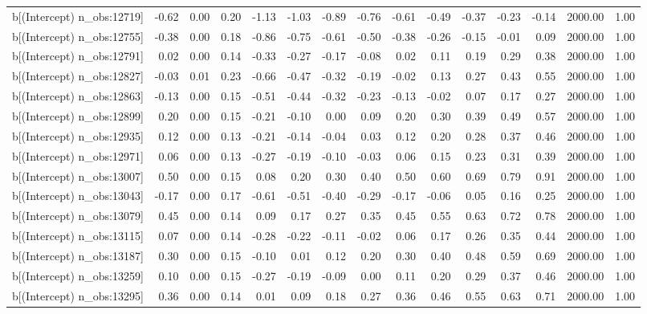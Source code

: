 \begin{table}[ht]
\begin{tabular}{rrrrrrrrrrrrrrr}
  b[(Intercept) n\_obs:12719] & -0.62 & 0.00 & 0.20 & -1.13 & -1.03 & -0.89 & -0.76 & -0.61 & -0.49 & -0.37 & -0.23 & -0.14 & 2000.00 & 1.00 \\ 
  b[(Intercept) n\_obs:12755] & -0.38 & 0.00 & 0.18 & -0.86 & -0.75 & -0.61 & -0.50 & -0.38 & -0.26 & -0.15 & -0.01 & 0.09 & 2000.00 & 1.00 \\ 
  b[(Intercept) n\_obs:12791] & 0.02 & 0.00 & 0.14 & -0.33 & -0.27 & -0.17 & -0.08 & 0.02 & 0.11 & 0.19 & 0.29 & 0.38 & 2000.00 & 1.00 \\ 
  b[(Intercept) n\_obs:12827] & -0.03 & 0.01 & 0.23 & -0.66 & -0.47 & -0.32 & -0.19 & -0.02 & 0.13 & 0.27 & 0.43 & 0.55 & 2000.00 & 1.00 \\ 
  b[(Intercept) n\_obs:12863] & -0.13 & 0.00 & 0.15 & -0.51 & -0.44 & -0.32 & -0.23 & -0.13 & -0.02 & 0.07 & 0.17 & 0.27 & 2000.00 & 1.00 \\ 
  b[(Intercept) n\_obs:12899] & 0.20 & 0.00 & 0.15 & -0.21 & -0.10 & 0.00 & 0.09 & 0.20 & 0.30 & 0.39 & 0.49 & 0.57 & 2000.00 & 1.00 \\ 
  b[(Intercept) n\_obs:12935] & 0.12 & 0.00 & 0.13 & -0.21 & -0.14 & -0.04 & 0.03 & 0.12 & 0.20 & 0.28 & 0.37 & 0.46 & 2000.00 & 1.00 \\ 
  b[(Intercept) n\_obs:12971] & 0.06 & 0.00 & 0.13 & -0.27 & -0.19 & -0.10 & -0.03 & 0.06 & 0.15 & 0.23 & 0.31 & 0.39 & 2000.00 & 1.00 \\ 
  b[(Intercept) n\_obs:13007] & 0.50 & 0.00 & 0.15 & 0.08 & 0.20 & 0.30 & 0.40 & 0.50 & 0.60 & 0.69 & 0.79 & 0.91 & 2000.00 & 1.00 \\ 
  b[(Intercept) n\_obs:13043] & -0.17 & 0.00 & 0.17 & -0.61 & -0.51 & -0.40 & -0.29 & -0.17 & -0.06 & 0.05 & 0.16 & 0.25 & 2000.00 & 1.00 \\ 
  b[(Intercept) n\_obs:13079] & 0.45 & 0.00 & 0.14 & 0.09 & 0.17 & 0.27 & 0.35 & 0.45 & 0.55 & 0.63 & 0.72 & 0.78 & 2000.00 & 1.00 \\ 
  b[(Intercept) n\_obs:13115] & 0.07 & 0.00 & 0.14 & -0.28 & -0.22 & -0.11 & -0.02 & 0.06 & 0.17 & 0.26 & 0.35 & 0.44 & 2000.00 & 1.00 \\ 
  b[(Intercept) n\_obs:13187] & 0.30 & 0.00 & 0.15 & -0.10 & 0.01 & 0.12 & 0.20 & 0.30 & 0.40 & 0.48 & 0.59 & 0.69 & 2000.00 & 1.00 \\ 
  b[(Intercept) n\_obs:13259] & 0.10 & 0.00 & 0.15 & -0.27 & -0.19 & -0.09 & 0.00 & 0.11 & 0.20 & 0.29 & 0.37 & 0.46 & 2000.00 & 1.00 \\ 
  b[(Intercept) n\_obs:13295] & 0.36 & 0.00 & 0.14 & 0.01 & 0.09 & 0.18 & 0.27 & 0.36 & 0.46 & 0.55 & 0.63 & 0.71 & 2000.00 & 1.00 \\ 

\end{tabular}
\end{table}
